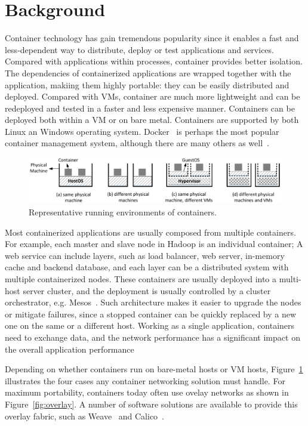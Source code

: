 \section{Background}
\label{sec:motivation}

Container technology has gain tremendous popularity since it enables a fast and
less-dependent way to distribute, deploy or test applications and services.
Compared with applications within processes, container provides better
isolation. The dependencies of containerized applications are wrapped together
with the application, makiing them highly portable: they can be easily
distributed and deployed.  Compared with VMs, container are much more
lightweight and can be redeployed and tested in a faster and less expensive
manner. Containers can be deployed both within a VM or on bare metal. Containers
are supported by both Linux an Windows operating system.  Docker~\cite{xxx} is
perhaps the most popular container management system, although there are many
others as well~\cite{xxx}.

\begin{figure}  
	\centering   
	\includegraphics[width=6.7in]{figures/deployment-cases.pdf}   
	\caption{\label{fig:deploy-cases} Representative running environments of containers.}   
\end{figure}

Most containerized applications are usually composed from multiple containers.
For example, each master and slave node in Hadoop is an individual container; A
web service can include layers, such as load balancer, web server, in-memory
cache and backend database, and each layer can be a distributed system with
multiple containerized nodes. These containers are usually deployed into a
multi-host server cluster, and the deployment is usually controlled by a cluster
orchestrator, e.g. Mesos~\cite{xxx}.  Such architecture makes it easier to
upgrade the nodes or mitigate failures, since a stopped container can be quickly
replaced by a new one on the same or a different host.  Working as a single
application, containers need to exchange data, and the network performance has a
significant impact on the overall application performance~\cite{coflow-etc.}

Depending on whether containers run on bare-metal hosts or VM hosts,
Figure~\ref{fig:deploy-cases} illustrates the four cases any container
networking solution must handle. For maximum portability, containers today often
use ovelay networks as shown in Figure~\ref{fig:overlay}. A number of software
solutions are available to provide this overlay fabric, such as
Weave~\cite{wave} and Calico~\cite{calico}. 

